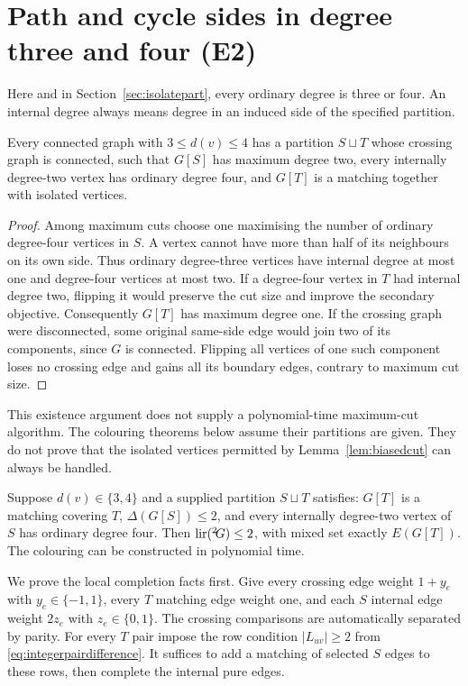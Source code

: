 \section{Path and cycle sides in degree three and four (E2)}\label{sec:pathcyclepart}

Here and in Section~\ref{sec:isolatepart}, every ordinary degree is three
or four. An internal degree always means degree in an induced side of
the specified partition.

\begin{lemma}\label{lem:biasedcut}
Every connected graph with $3\le d(v)\le4$ has a partition $S\sqcup T$
whose crossing graph is connected, such that $G[S]$ has maximum degree
two, every internally degree-two vertex has ordinary degree four,
and $G[T]$ is a matching together with isolated vertices.
\end{lemma}
\begin{proof}
Among maximum cuts choose one maximising the number of ordinary
degree-four vertices in $S$. A vertex cannot have more than half of
its neighbours on its own side. Thus ordinary degree-three vertices
have internal degree at most one and degree-four vertices at most two.
If a degree-four vertex in $T$ had internal degree two, flipping it
would preserve the cut size and improve the secondary objective.
Consequently $G[T]$ has maximum degree one.
If the crossing graph were disconnected, some original same-side edge
would join two of its components, since $G$ is connected. Flipping all
vertices of one such component loses no crossing edge and gains all its
boundary edges, contrary to maximum cut size.
\end{proof}

This existence argument does not supply a polynomial-time maximum-cut
algorithm. The colouring theorems below assume their partitions are
given. They do not prove that the isolated vertices permitted by
Lemma~\ref{lem:biasedcut} can always be handled.

\begin{theorem}\label{thm:pathcyclepart}
Suppose $d(v)\in\{3,4\}$ and a supplied partition $S\sqcup T$ satisfies:
$G[T]$ is a matching covering $T$, $\Delta(G[S])\le2$, and every
internally degree-two vertex of $S$ has ordinary degree four.
Then $\operatorname{lir}({}^{2}\!G)\le2$, with mixed set exactly $E(G[T])$.
The colouring can be constructed in polynomial time.
\end{theorem}

We prove the local completion facts first. Give every crossing edge
weight $1+y_e$ with $y_e\in\{-1,1\}$, every $T$ matching edge weight one,
and each $S$ internal edge weight $2z_e$ with $z_e\in\{0,1\}$.
The crossing comparisons are automatically separated by parity.
For every $T$ pair impose the row condition $|L_{uv}|\ge2$ from
\eqref{eq:integerpairdifference}. It suffices to add a matching of
selected $S$ edges to these rows, then complete the internal pure edges.

